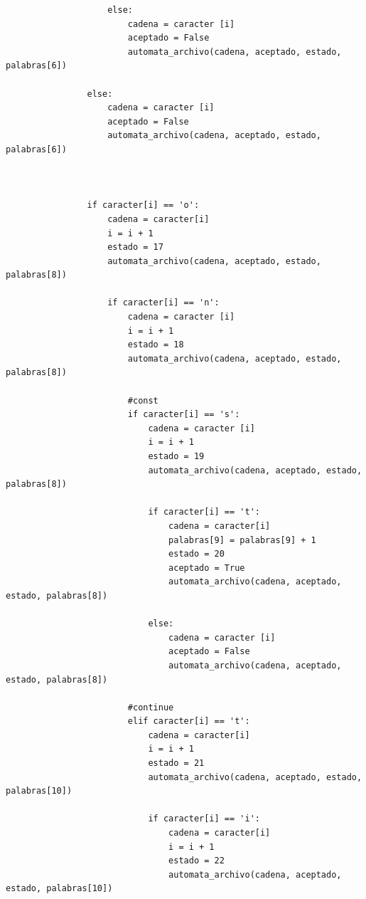 \documentclass{article}
\begin{document}
\begin{flushleft}
\begin{lstlisting}
                    else:
                        cadena = caracter [i]
                        aceptado = False
                        automata_archivo(cadena, aceptado, estado, palabras[6])
                
                else:
                    cadena = caracter [i]
                    aceptado = False
                    automata_archivo(cadena, aceptado, estado, palabras[6])
                    
                
                
                if caracter[i] == 'o':
                    cadena = caracter[i]
                    i = i + 1
                    estado = 17
                    automata_archivo(cadena, aceptado, estado, palabras[8])
                    
                    if caracter[i] == 'n':
                        cadena = caracter [i]
                        i = i + 1
                        estado = 18
                        automata_archivo(cadena, aceptado, estado, palabras[8])   
                        
                        #const
                        if caracter[i] == 's':
                            cadena = caracter [i]
                            i = i + 1
                            estado = 19
                            automata_archivo(cadena, aceptado, estado, palabras[8])
                            
                            if caracter[i] == 't':
                                cadena = caracter[i]
                                palabras[9] = palabras[9] + 1
                                estado = 20
                                aceptado = True
                                automata_archivo(cadena, aceptado, estado, palabras[8])
                                
                            else:
                                cadena = caracter [i]
                                aceptado = False
                                automata_archivo(cadena, aceptado, estado, palabras[8])
                                
                        #continue
                        elif caracter[i] == 't':
                            cadena = caracter[i]
                            i = i + 1
                            estado = 21
                            automata_archivo(cadena, aceptado, estado, palabras[10])
                            
                            if caracter[i] == 'i':
                                cadena = caracter[i]
                                i = i + 1
                                estado = 22
                                automata_archivo(cadena, aceptado, estado, palabras[10])
                                

\end{lstlisting}
\end{flushleft}
\end{document}
